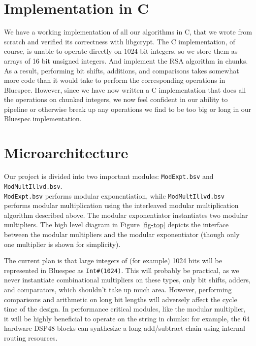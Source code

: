 \documentclass[12pt]{article}
\begin{document}
\section{Implementation in C}
We have a working implementation of all our algorithms in C, that we wrote from scratch and verified its correctness with libgcrypt.  
The C implementation, of course, is unable to operate directly on 1024 bit integers, so we store them as arrays of 16 bit unsigned integers. And implement the RSA algorithm in chunks.  
As a result, performing bit shifts, additions, and comparisons
takes somewhat more code than it would take to perform the corresponding operations in Bluespec.
However, since we have now written a C implementation that does all the operations on chunked integers,
we now feel confident in our ability to pipeline or otherwise break up
any operations we find to be too big or long in our Bluespec implementation.

\section{Microarchitecture}
Our project is divided into two important modules: {\tt ModExpt.bsv} and {\tt ModMultIllvd.bsv}.
\\
{\tt ModExpt.bsv} performs modular exponentiation,
while {\tt ModMultIllvd.bsv} performs modular multiplication using the interleaved modular multiplication algorithm described above.
The modular exponentiator instantiates two modular multipliers.
The high level diagram in Figure \ref{fig-top} depicts the interface between
the modular multipliers and the modular exponentiator
(though only one multiplier is shown for simplicity).

The current plan is that large integers of (for example) 1024 bits
will be represented in Bluespec as {\tt Int\#(1024)}.
This will probably be practical, as we never instantiate combinational multipliers on these types,
only bit shifts, adders, and comparators, which shouldn't take up much area. However, performing
comparisons and arithmetic on long bit lengths will adversely affect the cycle time of the design.
In performance critical modules, like the modular multiplier, it will be highly beneficial
to operate on the string in chunks: for example, the 64 hardware DSP48 blocks can synthesize
a long add/subtract chain using internal routing resources. 
\end{document}

